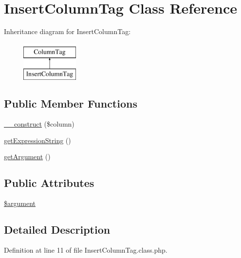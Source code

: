 \hypertarget{classInsertColumnTag}{\section{Insert\-Column\-Tag Class Reference}
\label{classInsertColumnTag}
}
Inheritance diagram for Insert\-Column\-Tag\-:\begin{figure}[H]
\begin{center}
\leavevmode
\includegraphics[height=2.000000cm]{classInsertColumnTag}
\end{center}
\end{figure}
\subsection*{Public Member Functions}
\begin{DoxyCompactItemize}
\item 
\hyperlink{classInsertColumnTag_af2834a640e8d1f70af8cdae080be2fec}{\-\_\-\-\_\-construct} (\$column)
\item 
\hyperlink{classInsertColumnTag_a77e3aba891447e4d9fddc8a91c6ca9da}{get\-Expression\-String} ()
\item 
\hyperlink{classInsertColumnTag_a951d60b78c53d03e3921c1082502ccc4}{get\-Argument} ()
\end{DoxyCompactItemize}
\subsection*{Public Attributes}
\begin{DoxyCompactItemize}
\item 
\hyperlink{classInsertColumnTag_a1aa52b3296f70706efacf27d1a1abc6c}{\$argument}
\end{DoxyCompactItemize}


\subsection{Detailed Description}


Definition at line 11 of file Insert\-Column\-Tag.\-class.\-php.




